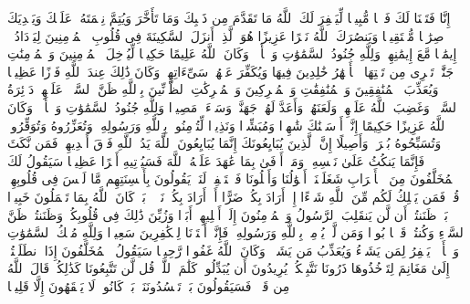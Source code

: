 \stopbuffer
\startbuffer[\q:48:1]
إِنَّا فَتَحۡنَا لَكَ فَتۡحࣰا مُّبِینࣰا%
\stopbuffer
\startbuffer[\q:48:2]
لِّیَغۡفِرَ لَكَ ٱللَّهُ مَا تَقَدَّمَ مِن ذَنۢبِكَ وَمَا تَأَخَّرَ وَیُتِمَّ نِعۡمَتَهُۥ عَلَیۡكَ وَیَهۡدِیَكَ صِرَٰطࣰا مُّسۡتَقِیمࣰا%
\stopbuffer
\startbuffer[\q:48:3]
وَیَنصُرَكَ ٱللَّهُ نَصۡرًا عَزِیزًا%
\stopbuffer
\startbuffer[\q:48:4]
هُوَ ٱلَّذِیۤ أَنزَلَ ٱلسَّكِینَةَ فِی قُلُوبِ ٱلۡمُؤۡمِنِینَ لِیَزۡدَادُوۤا۟ إِیمَٰنࣰا مَّعَ إِیمَٰنِهِمۡۗ وَلِلَّهِ جُنُودُ ٱلسَّمَٰوَٰتِ وَٱلۡأَرۡضِۚ وَكَانَ ٱللَّهُ عَلِیمًا حَكِیمࣰا%
\stopbuffer
\startbuffer[\q:48:5]
لِّیُدۡخِلَ ٱلۡمُؤۡمِنِینَ وَٱلۡمُؤۡمِنَٰتِ جَنَّٰتࣲ تَجۡرِی مِن تَحۡتِهَا ٱلۡأَنۡهَٰرُ خَٰلِدِینَ فِیهَا وَیُكَفِّرَ عَنۡهُمۡ سَیِّءَاتِهِمۡۚ وَكَانَ ذَٰلِكَ عِندَ ٱللَّهِ فَوۡزًا عَظِیمࣰا%
\stopbuffer
\startbuffer[\q:48:6]
وَیُعَذِّبَ ٱلۡمُنَٰفِقِینَ وَٱلۡمُنَٰفِقَٰتِ وَٱلۡمُشۡرِكِینَ وَٱلۡمُشۡرِكَٰتِ ٱلظَّاۤنِّینَ بِٱللَّهِ ظَنَّ ٱلسَّوۡءِۚ عَلَیۡهِمۡ دَاۤئِرَةُ ٱلسَّوۡءِۖ وَغَضِبَ ٱللَّهُ عَلَیۡهِمۡ وَلَعَنَهُمۡ وَأَعَدَّ لَهُمۡ جَهَنَّمَۖ وَسَاۤءَتۡ مَصِیرࣰا%
\stopbuffer
\startbuffer[\q:48:7]
وَلِلَّهِ جُنُودُ ٱلسَّمَٰوَٰتِ وَٱلۡأَرۡضِۚ وَكَانَ ٱللَّهُ عَزِیزًا حَكِیمًا%
\stopbuffer
\startbuffer[\q:48:8]
إِنَّاۤ أَرۡسَلۡنَٰكَ شَٰهِدࣰا وَمُبَشِّرࣰا وَنَذِیرࣰا%
\stopbuffer
\startbuffer[\q:48:9]
لِّتُؤۡمِنُوا۟ بِٱللَّهِ وَرَسُولِهِۦ وَتُعَزِّرُوهُ وَتُوَقِّرُوهُۚ وَتُسَبِّحُوهُ بُكۡرَةࣰ وَأَصِیلًا%
\stopbuffer
\startbuffer[\q:48:10]
إِنَّ ٱلَّذِینَ یُبَایِعُونَكَ إِنَّمَا یُبَایِعُونَ ٱللَّهَ یَدُ ٱللَّهِ فَوۡقَ أَیۡدِیهِمۡۚ فَمَن نَّكَثَ فَإِنَّمَا یَنكُثُ عَلَىٰ نَفۡسِهِۦۖ وَمَنۡ أَوۡفَىٰ بِمَا عَٰهَدَ عَلَیۡهُ ٱللَّهَ فَسَیُؤۡتِیهِ أَجۡرًا عَظِیمࣰا%
\stopbuffer
\startbuffer[\q:48:11]
سَیَقُولُ لَكَ ٱلۡمُخَلَّفُونَ مِنَ ٱلۡأَعۡرَابِ شَغَلَتۡنَاۤ أَمۡوَٰلُنَا وَأَهۡلُونَا فَٱسۡتَغۡفِرۡ لَنَاۚ یَقُولُونَ بِأَلۡسِنَتِهِم مَّا لَیۡسَ فِی قُلُوبِهِمۡۚ قُلۡ فَمَن یَمۡلِكُ لَكُم مِّنَ ٱللَّهِ شَیۡءًا إِنۡ أَرَادَ بِكُمۡ ضَرًّا أَوۡ أَرَادَ بِكُمۡ نَفۡعَۢاۚ بَلۡ كَانَ ٱللَّهُ بِمَا تَعۡمَلُونَ خَبِیرَۢا%
\stopbuffer
\startbuffer[\q:48:12]
بَلۡ ظَنَنتُمۡ أَن لَّن یَنقَلِبَ ٱلرَّسُولُ وَٱلۡمُؤۡمِنُونَ إِلَىٰۤ أَهۡلِیهِمۡ أَبَدࣰا وَزُیِّنَ ذَٰلِكَ فِی قُلُوبِكُمۡ وَظَنَنتُمۡ ظَنَّ ٱلسَّوۡءِ وَكُنتُمۡ قَوۡمَۢا بُورࣰا%
\stopbuffer
\startbuffer[\q:48:13]
وَمَن لَّمۡ یُؤۡمِنۢ بِٱللَّهِ وَرَسُولِهِۦ فَإِنَّاۤ أَعۡتَدۡنَا لِلۡكَٰفِرِینَ سَعِیرࣰا%
\stopbuffer
\startbuffer[\q:48:14]
وَلِلَّهِ مُلۡكُ ٱلسَّمَٰوَٰتِ وَٱلۡأَرۡضِۚ یَغۡفِرُ لِمَن یَشَاۤءُ وَیُعَذِّبُ مَن یَشَاۤءُۚ وَكَانَ ٱللَّهُ غَفُورࣰا رَّحِیمࣰا%
\stopbuffer
\startbuffer[\q:48:15]
سَیَقُولُ ٱلۡمُخَلَّفُونَ إِذَا ٱنطَلَقۡتُمۡ إِلَىٰ مَغَانِمَ لِتَأۡخُذُوهَا ذَرُونَا نَتَّبِعۡكُمۡۖ یُرِیدُونَ أَن یُبَدِّلُوا۟ كَلَٰمَ ٱللَّهِۚ قُل لَّن تَتَّبِعُونَا كَذَٰلِكُمۡ قَالَ ٱللَّهُ مِن قَبۡلُۖ فَسَیَقُولُونَ بَلۡ تَحۡسُدُونَنَاۚ بَلۡ كَانُوا۟ لَا یَفۡقَهُونَ إِلَّا قَلِیلࣰا%
